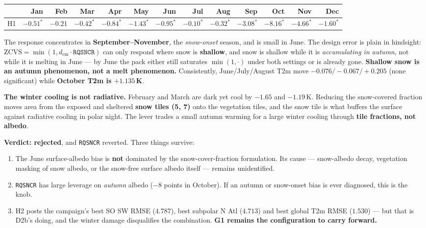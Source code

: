 \documentclass[10pt]{article}
\begin{document}
\begin{center}\footnotesize
\begin{tabular}{l r r r r r r r r r r r r}
\toprule
 & Jan & Feb & Mar & Apr & May & \textbf{Jun} & Jul & Aug & \textbf{Sep} & \textbf{Oct} & \textbf{Nov} & Dec \\
\midrule
H1 & $-0.51^{*}$ & $-0.21$ & $-0.42^{*}$ & $-0.84^{*}$ & $-1.43^{*}$ & $\mathbf{-0.95}^{*}$ &
$-0.10^{*}$ & $-0.32^{*}$ & $\mathbf{-3.08}^{*}$ & $\mathbf{-8.16}^{*}$ & $\mathbf{-4.66}^{*}$ & $-1.60^{*}$ \\
\bottomrule
\end{tabular}
\end{center}

\noindent The response concentrates in \textbf{September--November}, the \emph{snow-onset}
season, and is small in June. The design error is plain in hindsight:
$\mathrm{ZCVS}=\min(1, d_{\mathrm{cm}}\cdot\mathtt{RQSNCR})$ can only respond where snow is
\textbf{shallow}, and snow is shallow while it is \emph{accumulating in autumn}, not while it
is melting in June --- by June the pack either still saturates $\min(1,\cdot)$ under both
settings or is already gone. \textbf{Shallow snow is an autumn phenomenon, not a melt
phenomenon.} Consistently, June/July/August T2m move $-0.076/-0.067/+0.205$ (none
significant) while \textbf{October T2m is $+1.135$\,K}.

\noindent\textbf{The winter cooling is not radiative.} February and March are dark yet cool by
$-1.65$ and $-1.19$\,K. Reducing the snow-covered fraction moves area from the exposed and
sheltered \textbf{snow tiles (5, 7)} onto the vegetation tiles, and the snow tile is what
buffers the surface against radiative cooling in polar night. The lever trades a small autumn
warming for a large winter cooling through \textbf{tile fractions, not albedo}.

\noindent\textbf{Verdict: rejected}, and \texttt{RQSNCR} reverted. Three things survive:
\begin{enumerate}\itemsep2pt
\item The June surface-albedo bias is \textbf{not} dominated by the snow-cover-fraction
  formulation. Its cause --- snow-albedo decay, vegetation masking of snow albedo, or the
  snow-free surface albedo itself --- remains unidentified.
\item \texttt{RQSNCR} has large leverage on \emph{autumn} albedo ($-8$ points in October).
  If an autumn or snow-onset bias is ever diagnosed, this is the knob.
\item H2 posts the campaign's best SO SW RMSE ($4.787$), best subpolar N Atl ($4.713$) and
  best global T2m RMSE ($1.530$) --- but that is D2b's doing, and the winter damage
  disqualifies the combination. \textbf{G1 remains the configuration to carry forward.}
\end{enumerate}
\end{document}
